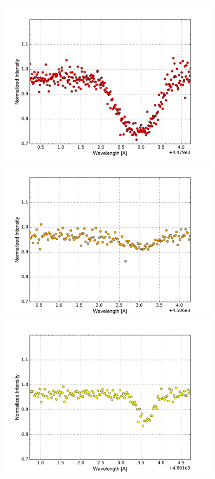 \documentclass[onecolumn]{aastex6}
\begin{document}
\begin{figure}[ht]
  \centering
  \includegraphics[scale=0.3]{mgII.pdf}%
  \includegraphics[scale=0.3]{feII.pdf}%
  \includegraphics[scale=0.3]{nV.pdf} \\%

\end{figure}
\end{document}
